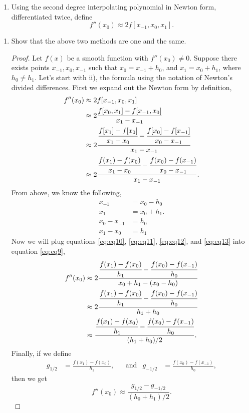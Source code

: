 \documentclass{article}
\begin{document}
\begin{enumerate}[label = \arabic*]
\begin{enumerate}[label = \roman*)]
			\item Using the second degree interpolating polynomial in Newton form, differentiated twice, define \[ f''(x_0) \approx 2f[x_{-1}, x_0, x_1]. \]
		\end{enumerate}
		\begin{enumerate}
			\item Show that the above two methods are one and the same.
			
			\begin{proof}
				Let $f(x)$ be a smooth function with $f''(x_0) \neq 0$. Suppose there exists points $x_{-1}, x_{0}, x_{-1}$ such that $x_{0} = x_{-1} + h_0$, and $x_1 = x_0 + h_1$, where $h_0 \neq h_1$. Let's start with ii), the formula using the notation of Newton's divided differences. First we expand out the Newton form by definition,
				\begin{align} \setcounter{equation}{0}
					f''(x_0) &\approx 2f[x_{-1}, x_0, x_1] \notag\\
							 &\approx 2\frac{f[x_0, x_1] - f[x_{-1}, x_0]}{x_1 - x_{-1}} \notag\\
							 &\approx 2\frac{\cfrac{f[x_1] - f[x_0]}{x_1 - x_0} - \cfrac{f[x_0] - f[x_{-1}]}{x_0 - x_{-1}}}{x_1 - x_{-1}} \notag\\
							 &\approx 2\frac{\cfrac{f(x_1) - f(x_0)}{x_1 - x_0} - \cfrac{f(x_0) - f(x_{-1})}{x_0 - x_{-1}}}{x_1 - x_{-1}}. \label{eq:eq9}
				\end{align}
				From above, we know the following,
				\begin{align}
					x_{-1} 		 &= x_0 - h_0 \label{eq:eq10}\\
					x_1    		 &= x_0 + h_1. \label{eq:eq11}\\
					x_0 - x_{-1} &= h_0 \label{eq:eq12}\\
					x_1 - x_0 	 &= h_1 \label{eq:eq13}
				\end{align}
				Now we will plug equations \ref{eq:eq10}, \ref{eq:eq11}, \ref{eq:eq12}, and \ref{eq:eq13} into equation \ref{eq:eq9},
				\begin{align*}
					f''(x_0) &\approx 2\frac{\cfrac{f(x_1) - f(x_0)}{h_1} - \cfrac{f(x_0) - f(x_{-1})}{h_0}}{x_0 + h_1 - (x_0 - h_0)} \\
							 &\approx 2\frac{\cfrac{f(x_1) - f(x_0)}{h_1} - \cfrac{f(x_0) - f(x_{-1})}{h_0}}{h_1 + h_0} \\
							 &\approx \frac{\cfrac{f(x_1) - f(x_0)}{h_1} - \cfrac{f(x_0) - f(x_{-1})}{h_0}}{(h_1 + h_0)/2}.
				\end{align*}
				Finally, if we define 
				\begin{align*}
					g_{1/2} &= \frac{f(x_1) - f(x_0)}{h_1}, & &\text{and} & g_{-1/2} &= \frac{f(x_0) - f(x_{-1})}{h_0},
				\end{align*}
				then we get \[ f''(x_0) \approx \frac{g_{1/2} - g_{-1/2}}{(h_0 + h_1)/2}. \]
			\end{proof}
			

\end{enumerate}
\end{enumerate}
\end{document}
